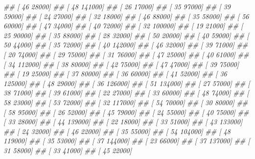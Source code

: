 \documentclass[
]{book}
\newenvironment{Shaded}{\begin{snugshade}}{\end{snugshade}}
\newcommand{\CommentTok}[1]{\textcolor[rgb]{0.56,0.35,0.01}{\textit{#1}}}
\theoremstyle{definition}
\theoremstyle{definition}
\theoremstyle{definition}
\theoremstyle{definition}
\theoremstyle{remark}
\begin{document}
\begin{Shaded}
\begin{Highlighting}[]
\CommentTok{\#\#  [    46  28000]}
\CommentTok{\#\#  [    48 141000]}
\CommentTok{\#\#  [    26  17000]}
\CommentTok{\#\#  [    35  97000]}
\CommentTok{\#\#  [    39  59000]}
\CommentTok{\#\#  [    24  27000]}
\CommentTok{\#\#  [    32  18000]}
\CommentTok{\#\#  [    46  88000]}
\CommentTok{\#\#  [    35  58000]}
\CommentTok{\#\#  [    56  60000]}
\CommentTok{\#\#  [    47  34000]}
\CommentTok{\#\#  [    40  72000]}
\CommentTok{\#\#  [    32 100000]}
\CommentTok{\#\#  [    19  21000]}
\CommentTok{\#\#  [    25  90000]}
\CommentTok{\#\#  [    35  88000]}
\CommentTok{\#\#  [    28  32000]}
\CommentTok{\#\#  [    50  20000]}
\CommentTok{\#\#  [    40  59000]}
\CommentTok{\#\#  [    50  44000]}
\CommentTok{\#\#  [    35  72000]}
\CommentTok{\#\#  [    40 142000]}
\CommentTok{\#\#  [    46  32000]}
\CommentTok{\#\#  [    39  71000]}
\CommentTok{\#\#  [    20  74000]}
\CommentTok{\#\#  [    29  75000]}
\CommentTok{\#\#  [    31  76000]}
\CommentTok{\#\#  [    47  25000]}
\CommentTok{\#\#  [    40  61000]}
\CommentTok{\#\#  [    34 112000]}
\CommentTok{\#\#  [    38  80000]}
\CommentTok{\#\#  [    42  75000]}
\CommentTok{\#\#  [    47  47000]}
\CommentTok{\#\#  [    39  75000]}
\CommentTok{\#\#  [    19  25000]}
\CommentTok{\#\#  [    37  80000]}
\CommentTok{\#\#  [    36  60000]}
\CommentTok{\#\#  [    41  52000]}
\CommentTok{\#\#  [    36 125000]}
\CommentTok{\#\#  [    48  29000]}
\CommentTok{\#\#  [    36 126000]}
\CommentTok{\#\#  [    51 134000]}
\CommentTok{\#\#  [    27  57000]}
\CommentTok{\#\#  [    38  71000]}
\CommentTok{\#\#  [    39  61000]}
\CommentTok{\#\#  [    22  27000]}
\CommentTok{\#\#  [    33  60000]}
\CommentTok{\#\#  [    48  74000]}
\CommentTok{\#\#  [    58  23000]}
\CommentTok{\#\#  [    53  72000]}
\CommentTok{\#\#  [    32 117000]}
\CommentTok{\#\#  [    54  70000]}
\CommentTok{\#\#  [    30  80000]}
\CommentTok{\#\#  [    58  95000]}
\CommentTok{\#\#  [    26  52000]}
\CommentTok{\#\#  [    45  79000]}
\CommentTok{\#\#  [    24  55000]}
\CommentTok{\#\#  [    40  75000]}
\CommentTok{\#\#  [    33  28000]}
\CommentTok{\#\#  [    44 139000]}
\CommentTok{\#\#  [    22  18000]}
\CommentTok{\#\#  [    33  51000]}
\CommentTok{\#\#  [    43 133000]}
\CommentTok{\#\#  [    24  32000]}
\CommentTok{\#\#  [    46  22000]}
\CommentTok{\#\#  [    35  55000]}
\CommentTok{\#\#  [    54 104000]}
\CommentTok{\#\#  [    48 119000]}
\CommentTok{\#\#  [    35  53000]}
\CommentTok{\#\#  [    37 144000]}
\CommentTok{\#\#  [    23  66000]}
\CommentTok{\#\#  [    37 137000]}
\CommentTok{\#\#  [    31  58000]}
\CommentTok{\#\#  [    33  41000]}
\CommentTok{\#\#  [    45  22000]}

\end{Highlighting}
\end{Shaded}
\end{document}
